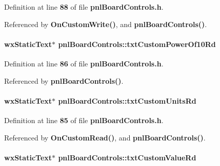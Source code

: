 Definition at line {\bf 88} of file {\bf pnl\+Board\+Controls.\+h}.



Referenced by {\bf On\+Custom\+Write()}, and {\bf pnl\+Board\+Controls()}.

\paragraph[{txt\+Custom\+Power\+Of10\+Rd}]{\setlength{\rightskip}{0pt plus 5cm}wx\+Static\+Text$\ast$ pnl\+Board\+Controls\+::txt\+Custom\+Power\+Of10\+Rd\hspace{0.3cm}{\ttfamily [protected]}}\label{classpnlBoardControls_ab81ef2e370968a2ee796a94e5c7c4849}


Definition at line {\bf 86} of file {\bf pnl\+Board\+Controls.\+h}.



Referenced by {\bf pnl\+Board\+Controls()}.

\paragraph[{txt\+Custom\+Units\+Rd}]{\setlength{\rightskip}{0pt plus 5cm}wx\+Static\+Text$\ast$ pnl\+Board\+Controls\+::txt\+Custom\+Units\+Rd\hspace{0.3cm}{\ttfamily [protected]}}\label{classpnlBoardControls_ad80673416b21172fd9829b5fb17f975c}


Definition at line {\bf 85} of file {\bf pnl\+Board\+Controls.\+h}.



Referenced by {\bf On\+Custom\+Read()}, and {\bf pnl\+Board\+Controls()}.

\paragraph[{txt\+Custom\+Value\+Rd}]{\setlength{\rightskip}{0pt plus 5cm}wx\+Static\+Text$\ast$ pnl\+Board\+Controls\+::txt\+Custom\+Value\+Rd\hspace{0.3cm}{\ttfamily [protected]}}\label{classpnlBoardControls_a0079646fb23052b7456a804af28b8d90}


